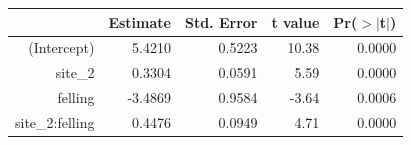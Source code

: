 
\begin{table}[ht]
\centering
\begin{tabular}{rrrrr}
  \hline
 & Estimate & Std. Error & t value & Pr($>$$|$t$|$) \\ 
  \hline
(Intercept) & 5.4210 & 0.5223 & 10.38 & 0.0000 \\ 
  site\_2 & 0.3304 & 0.0591 & 5.59 & 0.0000 \\ 
  felling & -3.4869 & 0.9584 & -3.64 & 0.0006 \\ 
  site\_2:felling & 0.4476 & 0.0949 & 4.71 & 0.0000 \\ 
   \hline
\end{tabular}
\end{table}


